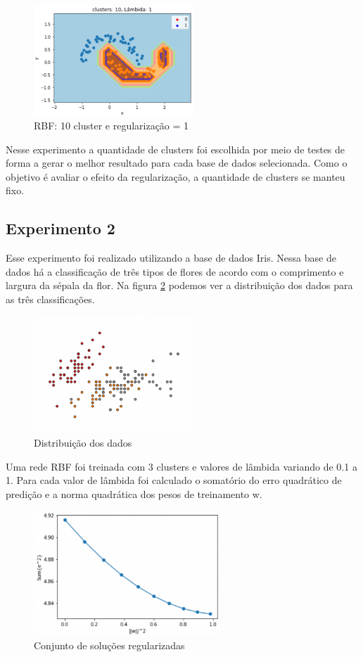   \begin{figure}[H]
    \center
    \includegraphics[width=6cm]{images/img4.png}
    \caption{\label{img4}RBF: 10 cluster e regularização = 1}
  \end{figure}

Nesse experimento a quantidade de clusters foi escolhida por meio de testes de forma a gerar o melhor resultado para cada base de dados selecionada. Como o objetivo é avaliar
o efeito da regularização, a quantidade de clusters se manteu fixo.




\subsection*{Experimento 2}

Esse experimento foi realizado utilizando a base de dados Iris. Nessa base de dados há a classificação de três tipos de flores de acordo com o comprimento e largura da sépala da flor.
Na figura \ref*{img5} podemos ver a distribuição dos dados para as três classificações.

\begin{figure}[H]
    \center
    \includegraphics[width=6cm]{images/img5.png}
    \caption{\label{img5}Distribuição dos dados}
  \end{figure}

Uma rede RBF foi treinada com 3 clusters e valores de lâmbida variando de 0.1 a 1.
Para cada valor de lâmbida foi calculado o somatório do erro quadrático de predição e a norma quadrática dos pesos de treinamento w.

\begin{figure}[H]
    \center
    \includegraphics[width=7cm]{images/img6.png}
    \caption{\label{img6}Conjunto de soluções regularizadas}
\end{figure}

